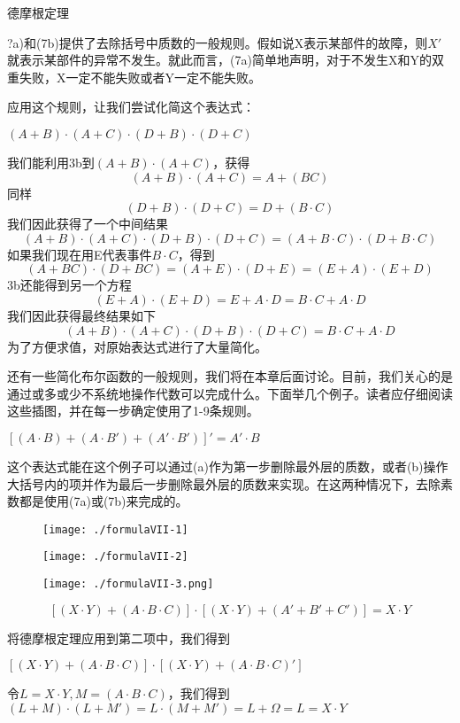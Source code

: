 \documentclass[cn,11pt,chinese]{elegantbook}
\begin{document}
德摩根定理{?a)和(7b)提供了去除括号中质数的一般规则。假如说X表示某部件的故障，则$X'$就表示某部件的异常不发生。就此而言，(7a)简单地声明，对于不发生X和Y的双重失败，X一定不能失败或者Y一定不能失败。
	
应用这个规则，让我们尝试化简这个表达式：

$(A+B)\cdot(A+C)\cdot(D+B)\cdot(D+C)$

我们能利用3b到$(A+B)\cdot(A+C)$，获得
$$(A+B)\cdot(A+C)=A+(BC)$$
同样
$$(D+B)\cdot(D+C)=D+(B\cdot C)$$
我们因此获得了一个中间结果
$$(A+B)\cdot(A+C)\cdot(D+B)\cdot(D+C)=(A+B\cdot C)\cdot(D+B\cdot C)$$
如果我们现在用E代表事件$B\cdot C$，得到
$$(A+BC)\cdot(D+BC)=(A+E)\cdot(D+E)=(E+A)\cdot(E+D)$$
3b还能得到另一个方程
$$(E+A)\cdot(E+D)=E+A\cdot D=B\cdot C+A\cdot D$$
我们因此获得最终结果如下
$$(A+B)\cdot(A+C)\cdot(D+B)\cdot(D+C)=B\cdot C+A\cdot D$$
为了方便求值，对原始表达式进行了大量简化。

还有一些简化布尔函数的一般规则，我们将在本章后面讨论。目前，我们关心的是通过或多或少不系统地操作代数可以完成什么。下面举几个例子。读者应仔细阅读这些插图，并在每一步确定使用了1-9条规则。

\begin{example}
	$[(A\cdot B)+(A\cdot B')+(A' \cdot B')]'=A'\cdot B$
\end{example}

这个表达式能在这个例子可以通过(a)作为第一步删除最外层的质数，或者(b)操作大括号内的项并作为最后一步删除最外层的质数来实现。在这两种情况下，去除素数都是使用(7a)或(7b)来完成的。


\begin{figure}[H]
	\texttt{[image: ./formulaVII-1]}
	
	\texttt{[image: ./formulaVII-2]}
\end{figure}

\begin{example}
	\begin{figure}[H]
	\texttt{[image: ./formulaVII-3.png]}
	\end{figure}
\end{example}

\begin{example}
	$$[(X\cdot Y)+(A\cdot B\cdot C)]\cdot[(X\cdot Y)+(A'+B'+C')]=X\cdot Y$$
\end{example}

将德摩根定理应用到第二项中，我们得到

$[(X\cdot Y)+(A\cdot B\cdot C)]\cdot[(X\cdot Y)+(A\cdot B\cdot C)']$

令$L=X\cdot Y,M=(A\cdot B\cdot C)$，我们得到
$(L+M)\cdot(L+M')=L\cdot(M+M')=L+\Omega=L=X\cdot Y$

}
\end{document}
